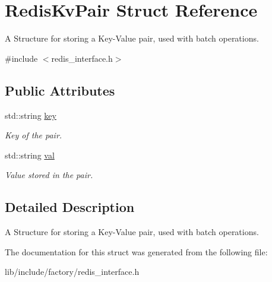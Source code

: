 \hypertarget{structRedisKvPair}{\section{Redis\-Kv\-Pair Struct Reference}
\label{structRedisKvPair}
}


A Structure for storing a Key-\/\-Value pair, used with batch operations.  




{\ttfamily \#include $<$redis\-\_\-interface.\-h$>$}

\subsection*{Public Attributes}
\begin{DoxyCompactItemize}
\item 
\hypertarget{structRedisKvPair_af3f52908debaab15e1ed092801d9a875}{std\-::string \hyperlink{structRedisKvPair_af3f52908debaab15e1ed092801d9a875}{key}}\label{structRedisKvPair_af3f52908debaab15e1ed092801d9a875}

\begin{DoxyCompactList}\small\item\em Key of the pair. \end{DoxyCompactList}\item 
\hypertarget{structRedisKvPair_a4d376aa2e230347adc28ac942e3da043}{std\-::string \hyperlink{structRedisKvPair_a4d376aa2e230347adc28ac942e3da043}{val}}\label{structRedisKvPair_a4d376aa2e230347adc28ac942e3da043}

\begin{DoxyCompactList}\small\item\em Value stored in the pair. \end{DoxyCompactList}\end{DoxyCompactItemize}


\subsection{Detailed Description}
A Structure for storing a Key-\/\-Value pair, used with batch operations. 

The documentation for this struct was generated from the following file\-:\begin{DoxyCompactItemize}
\item 
lib/include/factory/redis\-\_\-interface.\-h\end{DoxyCompactItemize}
